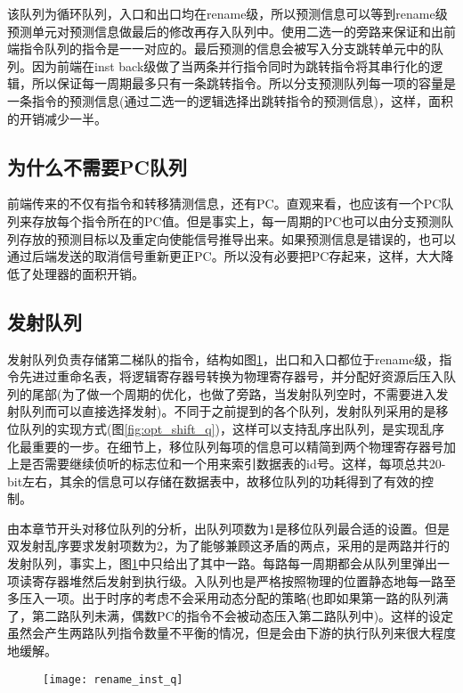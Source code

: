 该队列为循环队列，入口和出口均在rename级，所以预测信息可以等到rename级预测单元对预测信息做最后的修改再存入队列中。使用二选一的旁路来保证和出前端指令队列的指令是一一对应的。最后预测的信息会被写入分支跳转单元中的队列。因为前端在inst back级做了当两条并行指令同时为跳转指令将其串行化的逻辑，所以保证每一周期最多只有一条跳转指令。所以分支预测队列每一项的容量是一条指令的预测信息(通过二选一的逻辑选择出跳转指令的预测信息)，这样，面积的开销减少一半。

\subsection{为什么不需要PC队列}

前端传来的不仅有指令和转移猜测信息，还有PC。直观来看，也应该有一个PC队列来存放每个指令所在的PC值。但是事实上，每一周期的PC也可以由分支预测队列存放的预测目标以及重定向使能信号推导出来。如果预测信息是错误的，也可以通过后端发送的取消信号重新更正PC。所以没有必要把PC存起来，这样，大大降低了处理器的面积开销。

\subsection{发射队列}

发射队列负责存储第二梯队的指令，结构如图\ref{fig:rename_inst_q}，出口和入口都位于rename级，指令先进过重命名表，将逻辑寄存器号转换为物理寄存器号，并分配好资源后压入队列的尾部(为了做一个周期的优化，也做了旁路，当发射队列空时，不需要进入发射队列而可以直接选择发射)。不同于之前提到的各个队列，发射队列采用的是移位队列的实现方式(图\ref{fig:opt_shift_q})，这样可以支持乱序出队列，是实现乱序化最重要的一步。在细节上，移位队列每项的信息可以精简到两个物理寄存器号加上是否需要继续侦听的标志位和一个用来索引数据表的id号。这样，每项总共20-bit左右，其余的信息可以存储在数据表中，故移位队列的功耗得到了有效的控制。

由本章节开头对移位队列的分析，出队列项数为1是移位队列最合适的设置。但是双发射乱序要求发射项数为2，为了能够兼顾这矛盾的两点，采用的是两路并行的发射队列，事实上，图\ref{fig:rename_inst_q}中只给出了其中一路。每路每一周期都会从队列里弹出一项读寄存器堆然后发射到执行级。入队列也是严格按照物理的位置静态地每一路至多压入一项。出于时序的考虑不会采用动态分配的策略(也即如果第一路的队列满了，第二路队列未满，偶数PC的指令不会被动态压入第二路队列中)。这样的设定虽然会产生两路队列指令数量不平衡的情况，但是会由下游的执行队列来很大程度地缓解。
\begin{figure}[!htbp]
	\centering
	\texttt{[image: rename\_inst\_q]}
	\label{fig:rename_inst_q}
\end{figure}

